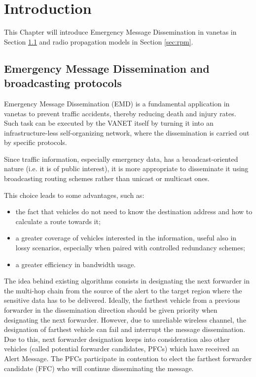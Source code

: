 
\chapter{Introduction}
	This Chapter will introduce Emergency Message Dissemination in \acrshort{vaneta}s in Section \ref{sec:emd} and radio propagation models in Section \ref{sec:rpm}.
	\section{Emergency Message Dissemination and broadcasting protocols}
		\label{sec:emd}
		Emergency Message Dissemination (EMD) is a fundamental application in \acrshort{vaneta}s to prevent traffic accidents, thereby reducing death and injury rates. Such task can be executed by the VANET itself by turning it into an infrastructure-less self-organizing network, where the dissemination is carried out by specific protocols. 
		
		
		Since traffic information, especially emergency data, has a broadcast-oriented nature (i.e. it is of public interest), it is more appropriate to disseminate it using broadcasting routing schemes rather than unicast or multicast ones.\cite{5989903}
		
		This choice leads to some advantages, such as:
		\begin{itemize}
			\item the fact that vehicles do not need to know the destination address and how to calculate a route towards it;
			\item a greater coverage of vehicles interested in the information, useful also in lossy scenarios, especially when paired with controlled redundancy schemes;
			\item a greater efficiency in bandwidth usage.
		\end{itemize}
		
		The idea behind existing algorithms consists in designating the next forwarder in the multi-hop chain from the source of the alert to the target region where the sensitive data has to be delivered. Ideally, the farthest vehicle from a previous forwarder in the dissemination direction should be given priority when designating the next forwarder. However, due to unreliable wireless channel, the designation of farthest vehicle can fail and interrupt the message dissemination. Due to this, next forwarder designation keeps into consideration also other vehicles (called potential forwarder candidates, PFCs) which have received an Alert Message. The PFCs participate in contention to elect the farthest forwarder candidate (FFC) who will continue disseminating the message.
		
